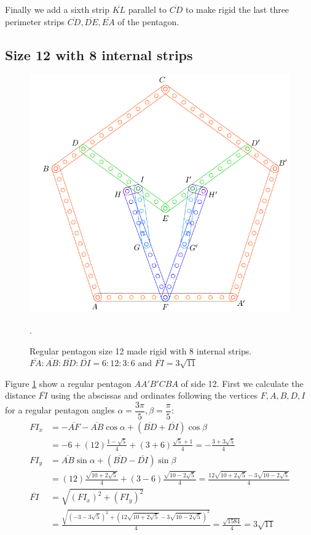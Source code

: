 \documentclass[11pt]{article}
\begin{document}
Finally we add a sixth strip $\overline{KL}$ parallel to $\overline{CD}$ to make rigid the last three perimeter strips $\overline{CD},\overline{DE},\overline{EA}$ of the pentagon.

\subsection{Size 12 with 8 internal strips}

\begin{figure}[h]
 \centering
 \includegraphics[scale=0.8]{12/penta12-8a}
 \caption{Regular pentagon size 12 made rigid with 8 internal strips. $\overline{FA}:\overline{AB}:\overline{BD}:\overline{DI} = 6:12:3:6$ and $\overline{FI} = 3\sqrt{11}$}.
 \label{fig:penta12-8a}
\end{figure}

Figure \ref{fig:penta12-8a} show a regular pentagon $AA'B'CBA$ of side 12.
First we calculate the distance $\overline{FI}$ using the abscissas and ordinates following the vertices $F,A,B,D,I$ for a regular pentagon angles $\alpha=\dfrac{3\pi}5, \beta=\dfrac{\pi}5$:
\begin{align}
FI_x &= -\overline{AF} - \overline{AB}\cos\alpha + (\overline{BD} + \overline{DI})\cos\beta\nonumber\\
 &= -6 + (12)\frac{1-\sqrt5}4 + (3+6)\frac{\sqrt5+1}4 = -\frac{3+3\sqrt5}4\\
FI_y &= \overline{AB}\sin\alpha + (\overline{BD}-\overline{DI})\sin\beta\nonumber\\
 &= (12)\frac{\sqrt{10+2\sqrt5}}4 + (3-6)\frac{\sqrt{10-2\sqrt5}}4
 = \frac{12\sqrt{10+2\sqrt5} - 3\sqrt{10-2\sqrt5}}4\\
\overline{FI} &= \sqrt{(FI_x)^2 + (FI_y)^2}\nonumber\\
 &= \frac{\sqrt{(-3-3\sqrt5)^2 + (12\sqrt{10+2\sqrt5} - 3\sqrt{10-2\sqrt5})^2}}4
 = \frac{\sqrt{1584}}4 = 3\sqrt{11}
\end{align}
\end{document}
